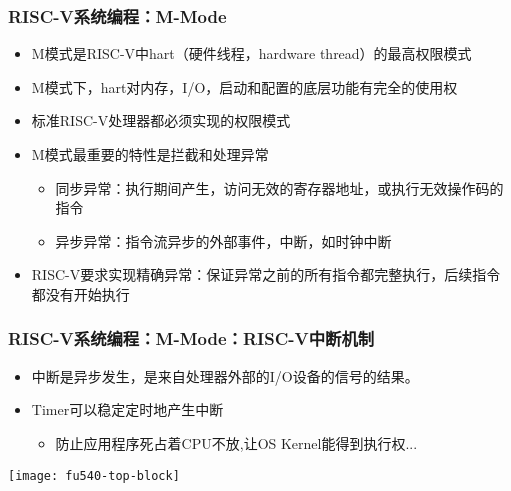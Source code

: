 
\begin{frame}
    \frametitle{RISC-V系统编程：M-Mode}
    \begin{itemize}
        \item M模式是RISC-V中hart（硬件线程，hardware thread）的最高权限模式       
        \item M模式下，hart对内存，I/O，启动和配置的底层功能有完全的使用权
        \item 标准RISC-V处理器都必须实现的权限模式
        \item M模式最重要的特性是拦截和处理异常
        \begin{itemize}
            \item 同步异常：执行期间产生，访问无效的寄存器地址，或执行无效操作码的指令
            \item 异步异常：指令流异步的外部事件，中断，如时钟中断
        \end{itemize}				
        \item RISC-V要求实现精确异常：保证异常之前的所有指令都完整执行，后续指令都没有开始执行
    \end{itemize}
    
\end{frame}


\begin{frame}[plain]
    \frametitle{RISC-V系统编程：M-Mode：RISC-V中断机制}
    \begin{itemize}
        \item 中断是异步发生，是来自处理器外部的I/O设备的信号的结果。
        
        
        \item Timer可以稳定定时地产生中断
        \begin{itemize}
            \item 防止应用程序死占着CPU不放,让OS Kernel能得到执行权...
        \end{itemize}				
        
    \end{itemize}
    
    \centering
    \texttt{[image: fu540-top-block]}
    
\end{frame}


